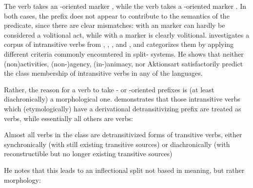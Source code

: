 \xe	
%
The  verb   takes an -oriented marker , while the  verb   takes a -oriented marker .
In both cases, the prefix does not appear to contribute to the semantics of the predicate, since there are clear mismatches:
 with an  marker can hardly be considered a volitional act, while   with a  marker is clearly volitional.
\textcite{meira2000split} investigates a corpus of intransitive verbs from \trio, \kalina, \apalai, and \wayana, and categorizes them by applying different criteria commonly encountered in split- systems.
He shows that neither (non\-)activities, %
(non-)agency, %
(in-)animacy, %
nor Aktionsart %
satisfactorily predict the class membership of intransitive verbs in any of the languages.

Rather, the reason for a verb to take - or -oriented prefixes is (at least diachronically) a morphological one.
\textcite[217--221]{meira2000split} demonstrates that those intransitive verbs which (etymologically) have a derivational detransitivizing prefix are treated as  verbs, while essentially all others are  verbs:
\begin{quotebox}{\parencite[201]{meira2000split}}
	Almost all verbs in the  class are detransitivized forms of transitive verbs, either synchronically (with still existing transitive sources) or diachronically (with reconstructible but no longer existing transitive sources)
\end{quotebox}
He notes that this leads to an inflectional split not based in meaning, but rather morphology:

